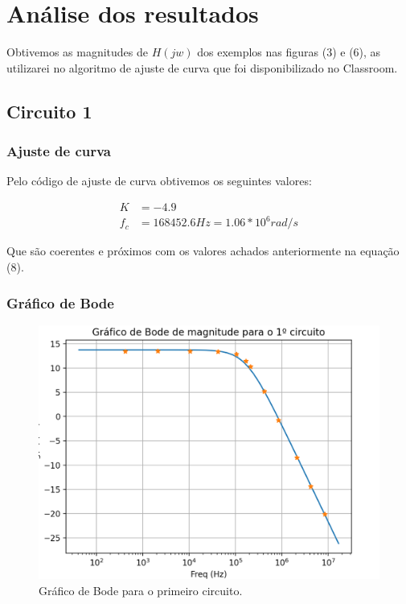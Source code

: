 
\section{Análise dos resultados}


Obtivemos as magnitudes de $H(jw)$ dos exemplos nas figuras (3) e (6), as utilizarei no algoritmo de ajuste de curva que foi disponibilizado no Classroom.


\subsection{Circuito 1}


\subsubsection{Ajuste de curva}


Pelo código de ajuste de curva obtivemos os seguintes valores:


\begin{equation}
    \begin{aligned}
        K   & = -4.9                            \\
        f_c & = 168452.6 Hz = 1.06 * 10^6 rad/s
    \end{aligned}
\end{equation}


Que são coerentes e próximos com os valores achados anteriormente na equação (8).


\subsubsection{Gráfico de Bode}


\begin{figure}[H]
    \centering
    \includegraphics[width=1\columnwidth]{images/bode1.png}
    \caption{Gráfico de Bode para o primeiro circuito.}
\end{figure}

